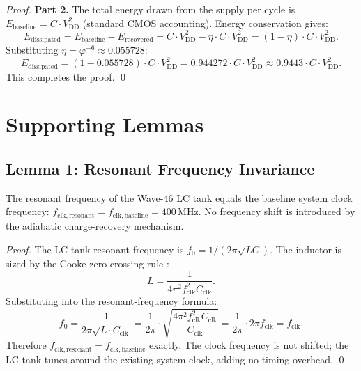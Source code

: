 \begin{proof}
\medskip
\textbf{Part 2.}
The total energy drawn from the supply per cycle is $E_{\mathrm{baseline}} =
C \cdot V_{\mathrm{DD}}^{2}$ (standard CMOS accounting).
Energy conservation gives:
\begin{equation}
  E_{\mathrm{dissipated}} = E_{\mathrm{baseline}} - E_{\mathrm{recovered}}
  = C \cdot V_{\mathrm{DD}}^{2} - \eta \cdot C \cdot V_{\mathrm{DD}}^{2}
  = (1 - \eta) \cdot C \cdot V_{\mathrm{DD}}^{2}.
\end{equation}
Substituting $\eta = \varphi^{-6} \approx 0.055728$:
\begin{equation}
  E_{\mathrm{dissipated}} = (1 - 0.055728) \cdot C \cdot V_{\mathrm{DD}}^{2}
  = 0.944272 \cdot C \cdot V_{\mathrm{DD}}^{2} \approx 0.9443 \cdot C \cdot V_{\mathrm{DD}}^{2}.
\end{equation}
This completes the proof.
\qed
\end{proof}

\section{Supporting Lemmas}
\label{sec:lemmas-w46}

\subsection{Lemma 1: Resonant Frequency Invariance}
\label{lemma:freqinv-w46}

\begin{lemma}\label{lem:freq-inv}
The resonant frequency of the Wave-46 LC tank equals the baseline system clock
frequency: $f_{\mathrm{clk,resonant}} = f_{\mathrm{clk,baseline}} = 400\,\text{MHz}$.
No frequency shift is introduced by the adiabatic charge-recovery mechanism.
\end{lemma}

\begin{proof}
The LC tank resonant frequency is $f_{0} = 1 / (2\pi\sqrt{LC})$.
The inductor is sized by the Cooke zero-crossing rule \citep{cooke_ieee_2003}:
\begin{equation}
  L = \frac{1}{4\pi^{2} f_{\mathrm{clk}}^{2} C_{\mathrm{clk}}}.
\end{equation}
Substituting into the resonant-frequency formula:
\begin{equation}
  f_{0} = \frac{1}{2\pi\sqrt{L \cdot C_{\mathrm{clk}}}}
  = \frac{1}{2\pi} \cdot \sqrt{\frac{4\pi^{2} f_{\mathrm{clk}}^{2}
    C_{\mathrm{clk}}}{C_{\mathrm{clk}}}}
  = \frac{1}{2\pi} \cdot 2\pi f_{\mathrm{clk}}
  = f_{\mathrm{clk}}.
\end{equation}
Therefore $f_{\mathrm{clk,resonant}} = f_{\mathrm{clk,baseline}}$ exactly.
The clock frequency is not shifted; the LC tank tunes around the existing
system clock, adding no timing overhead.
\qed
\end{proof}

